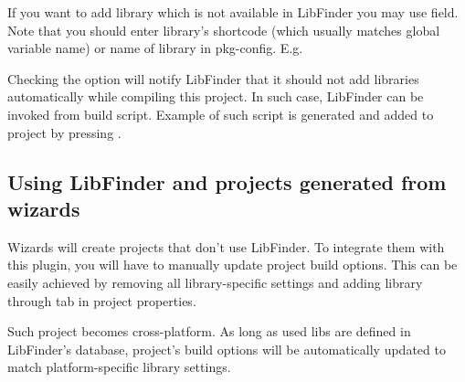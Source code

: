 If you want to add library which is not available in LibFinder you may use  field. Note that you should enter library's shortcode (which usually matches global variable name) or name of library in pkg-config. E.g.


Checking the  option will notify LibFinder that it should not add libraries automatically while compiling this project. In such case, LibFinder can be invoked from build script. Example of such script is generated and added to project by pressing .

\subsection{Using LibFinder and projects generated from wizards}

Wizards will create projects that don't use LibFinder. To integrate them with this plugin, you will have to manually update project build options. This can be easily achieved by removing all library-specific settings and adding library through  tab in project properties.

Such project becomes cross-platform. As long as used libs are defined in LibFinder's database, project's build options will be automatically updated to match platform-specific library settings.


